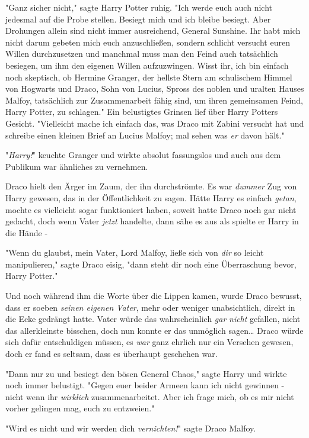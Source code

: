 {"Ganz sicher nicht," sagte Harry Potter ruhig. "Ich werde euch auch nicht jedesmal auf die Probe stellen. Besiegt mich und ich bleibe besiegt. Aber Drohungen allein sind nicht immer ausreichend, General Sunshine. Ihr habt mich nicht darum gebeten mich euch anzuschließen, sondern schlicht versucht euren Willen durchzusetzen und manchmal muss man den Feind auch tatsächlich besiegen, um ihm den eigenen Willen aufzuzwingen. Wisst ihr, ich bin einfach noch skeptisch, ob Hermine Granger, der hellste Stern am schulischem Himmel von Hogwarts und Draco, Sohn von Lucius, Spross des noblen und uralten Hauses Malfoy, tatsächlich zur Zusammenarbeit fähig sind, um ihren gemeinsamen Feind, Harry Potter, zu schlagen." Ein belustigtes Grinsen lief über Harry Potters Gesicht. "Vielleicht mache ich einfach das, was Draco mit Zabini versucht hat und schreibe einen kleinen Brief an Lucius Malfoy; mal sehen was \emph{er} davon hält."

"\emph{Harry!}" keuchte Granger und wirkte absolut fassungslos und auch aus dem Publikum war ähnliches zu vernehmen.

Draco hielt den Ärger im Zaum, der ihn durchströmte. Es war \emph{dummer} Zug von Harry gewesen, das in der Öffentlichkeit zu sagen. Hätte Harry es einfach \emph{getan}, mochte es vielleicht sogar funktioniert haben, soweit hatte Draco noch gar nicht gedacht, doch wenn Vater \emph{jetzt} handelte, dann sähe es aus als spielte er Harry in die Hände -

"Wenn du glaubst, mein Vater, Lord Malfoy, ließe sich von \emph{dir} so leicht manipulieren," sagte Draco eisig, "dann steht dir noch eine Überraschung bevor, Harry Potter."

Und noch während ihm die Worte über die Lippen kamen, wurde Draco bewusst, dass er soeben \emph{seinen eigenen Vater}, mehr oder weniger unabsichtlich, direkt in die Ecke gedrängt hatte. Vater würde das wahrscheinlich \emph{gar} \emph{nicht} gefallen, nicht das allerkleinste bisschen, doch nun konnte er das unmöglich sagen… Draco würde sich dafür entschuldigen müssen, es \emph{war} ganz ehrlich nur ein Versehen gewesen, doch er fand es seltsam, dass es überhaupt geschehen war.

"Dann nur zu und besiegt den bösen General Chaos," sagte Harry und wirkte noch immer belustigt. "Gegen euer beider Armeen kann ich nicht gewinnen - nicht wenn ihr \emph{wirklich} zusammenarbeitet. Aber ich frage mich, ob es mir nicht vorher gelingen mag, euch zu entzweien."

"Wird es nicht und wir werden dich \emph{vernichten!}" sagte Draco Malfoy.

}
